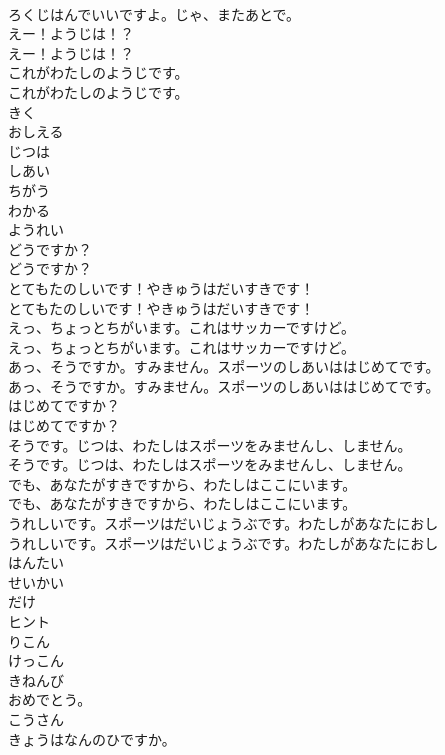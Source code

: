\documentclass[8pt]{extreport}
\begin{document}
\begin{CJK}{UTF8}{min}
\\	ろくじはんでいいですよ。じゃ、またあとで。 
\\	えー！ようじは！？	
\\	えー！ようじは！？ 
\\	これがわたしのようじです。	
\\	これがわたしのようじです。 
\\	きく
\\	おしえる
\\	じつは
\\	しあい
\\	ちがう
\\	わかる
\\	ようれい
\\	どうですか？	
\\	どうですか？ 
\\	とてもたのしいです！やきゅうはだいすきです！	
\\	とてもたのしいです！やきゅうはだいすきです！ 
\\	えっ、ちょっとちがいます。これはサッカーですけど。	
\\	えっ、ちょっとちがいます。これはサッカーですけど。 
\\	あっ、そうですか。すみません。スポーツのしあいははじめてです。	
\\	あっ、そうですか。すみません。スポーツのしあいははじめてです。 
\\	はじめてですか？	
\\	はじめてですか？ 
\\	そうです。じつは、わたしはスポーツをみませんし、しません。	
\\	そうです。じつは、わたしはスポーツをみませんし、しません。 
\\	でも、あなたがすきですから、わたしはここにいます。	
\\	でも、あなたがすきですから、わたしはここにいます。 
\\	うれしいです。スポーツはだいじょうぶです。わたしがあなたにおし	
\\	うれしいです。スポーツはだいじょうぶです。わたしがあなたにおし 
\\	はんたい
\\	せいかい
\\	だけ
\\	ヒント
\\	りこん
\\	けっこん
\\	きねんび
\\	おめでとう。
\\	こうさん
\\	きょうはなんのひですか。	

\end{CJK}
\end{document}
